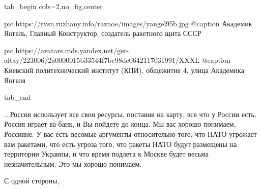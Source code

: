 \ifcmt
  tab_begin cols=2,no_fig,center

     pic https://rvsn.ruzhany.info/raznoe/images/yangel95b.jpg
		 @caption Академик Янгель, Главный Конструктор, создатель ракетного щита СССР

		 pic https://avatars.mds.yandex.net/get-altay/223006/2a0000015b33544f7bc98de0642117031991/XXXL
		 @caption Киевский политехнический институт (КПИ), общежитие 4, улица Академика Янгеля

  tab_end
\fi

...Россия использует все свои ресурсы, поставив на карту, все что у России
есть. Россия играет ва-банк, и Вы пойдете до конца. Мы вас хорошо понимаем,
Россияне. У вас есть весомые аргументы относительно того, что НАТО угрожает вам
ракетами, что есть угроза того, что ракеты НАТО будут размещены на территории
Украины, и что время подлета к Москве будет весьма незначительным. Это мы
хорошо понимаем. 

С одной стороны,
